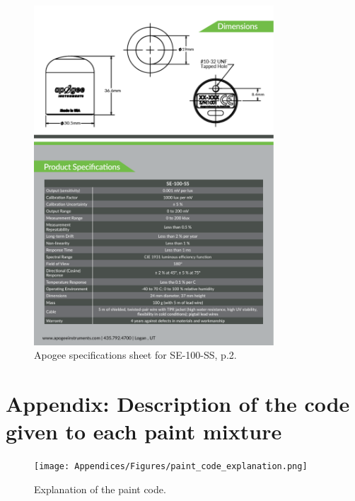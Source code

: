 \begin{appendices}
\newpage
\begin{figure}[!h]
\centering
\includegraphics[width=0.8\textwidth]{Appendices/Apogee_SE-100-SS_spec-sheet_p2.pdf}
\caption*{Apogee specifications sheet for SE-100-SS, p.2.}
\end{figure}




\newpage
\section[\hspace{0.3cm}Description of the code paint]{ Appendix: Description of the code given to each paint mixture}
\label{app:ch4_code-paint}

\begin{figure}[!h]
\centering
\texttt{[image: Appendices/Figures/paint\_code\_explanation.png]}
\caption*{Explanation of the paint code.}
\end{figure}





\end{appendices}
